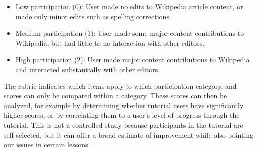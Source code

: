 \documentclass{acm_proc_article-sp}
\begin{document}
\begin{itemize}
\item Low participation (0): User made no edits to Wikipedia article content, or made only minor edits such as spelling corrections.
\item Medium participation (1): User made some major content contributions to Wikipedia, but had little to no interaction with other editors.
\item High participation (2): User made major content contributions to Wikipedia and interacted substantially with other editors.
\end{itemize}

The rubric indicates which items apply to which participation category, and scores can only be compared within a category. These scores can then be analyzed, for example by determining whether tutorial users have significantly higher scores, or by correlating them to a user's level of progress through the tutorial. This is not a controlled study because participants in the tutorial are self-selected, but it can offer a broad estimate of improvement while also pointing our issues in certain lessons.
\end{document}
